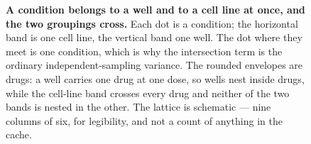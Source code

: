 \begin{figure}[htbp]
\caption[The two crossed groupings, and the drug the wells nest in]{\textbf{A
condition belongs to a well and to a cell line at once, and the two groupings
cross.} Each dot is a condition; the horizontal band is one cell line, the
vertical band one well. The dot where they meet is one condition, which is why
the intersection term is the ordinary independent-sampling variance. The
rounded envelopes are drugs: a well carries one drug at one dose, so wells nest
inside drugs, while the cell-line band crosses every drug and neither of the
two bands is nested in the other. The lattice is schematic --- nine columns of
six, for legibility, and not a count of anything in the cache.}
\label{fig:clustering}
\end{figure}
